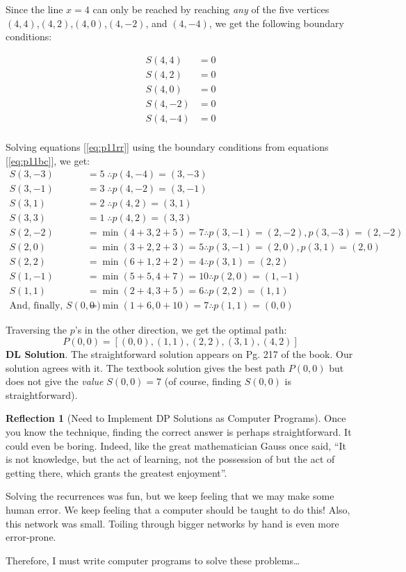 \documentclass[english,notitlepage,smartquotes]{hgbreport}
\theoremstyle{definition}
\theoremstyle{definition}
\theoremstyle{remark}
\theoremstyle{definition}
\theoremstyle{plain}
\theoremstyle{definition}
\newtheorem{reflection}{Reflection}
\begin{document}
Since the line $x=4$ can only be reached by reaching \emph{any} of the five vertices $(4,4)$,$(4,2)$,$(4,0)$,$(4,-2)$, and $(4,-4)$, we get the following boundary conditions:

\begin{equation}
\begin{aligned}
S(4,4) &= 0\\
S(4,2) &= 0\\
S(4,0) &= 0\\
S(4,-2) &= 0\\
S(4,-4) &= 0\\
\end{aligned}
\label{eq:p11bc}
\end{equation}

Solving equations [\ref{eq:p11rr}] using the boundary conditions from equations [\ref{eq:p11bc}], we get:
\begin{equation}
\begin{aligned}
S(3,-3) &= 5\;\therefore p(4,-4)=(3,-3)\\
S(3,-1) &= 3\;\therefore p(4,-2)=(3,-1)\\
S(3,1) &= 2\;\therefore p(4,2)=(3,1)\\
S(3,3) &= 1\;\therefore p(4,2)=(3,3)\\
S(2,-2) &= \min(4+3,2+5)=7 \therefore p(3,-1)=(2,-2), p(3,-3)=(2,-2)\\
S(2,0) &= \min(3+2,2+3)=5\therefore p(3,-1)=(2,0), p(3,1)=(2,0)\\
S(2,2) &= \min(6+1,2+2)=4\therefore p(3,1)=(2,2)\\
S(1,-1) &= \min(5+5,4+7)=10\therefore p(2,0)=(1,-1)\\
S(1,1) &= \min(2+4,3+5)=6\therefore p(2,2)=(1,1)\\
\text{And, finally, } S(0,0) &=\min(1+6,0+10)=7\therefore p(1,1)=(0,0)
\end{aligned}
\label{eq:p11sol}
\end{equation}

Traversing the $p$'s in the other direction, we get the optimal path:
\[
P(0,0)=[(0,0),(1,1),(2,2),(3,1),(4,2)]
\]
\textbf{DL Solution}. The straightforward solution appears on Pg. 217 of the book. Our solution agrees with it. The textbook solution gives the best path $P(0,0)$ but does not give the \emph{value} $S(0,0)=7$ (of course, finding $S(0,0)$ is straightforward).

\begin{reflection}[Need to Implement DP Solutions as Computer Programs]
Once you know the technique, finding the correct answer is perhaps straightforward. It could even be boring. Indeed, like the great mathematician Gauss once said, ``It is not knowledge, but the act of learning, not the possession of but the act of getting there, which grants the greatest enjoyment''.

Solving the recurrences was fun, but we keep feeling that we may make some human error. We keep feeling that a computer should be taught to do this! Also, this network was small. Toiling through bigger networks by hand is even more error-prone. 

Therefore, I must write computer programs to solve these problems\dots
\label{ref:needtoprog}
\end{reflection}
\end{document}
